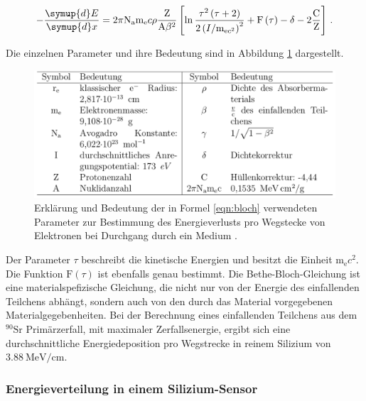 \begin{equation}
    - \frac{\symup{d}E}{\symup{d}x} = 2 \pi \text{N}_\text{a} \text{m}_\text{e} c \rho \frac{\text{Z}}{\text{A} \beta^2}
    \left[\ln{\frac{\tau^2 \left(\tau + 2 \right)}{2 \left(I / \text{m}_{\text{e} c^2} \right)^2}}   
    + \text{F}\left(\tau \right) - \delta - 2 \frac{\text{C}}{\text{Z}} \right] \, .
\label{eqn:bloch}
\end{equation}

Die einzelnen Parameter und ihre Bedeutung sind in Abbildung \ref{fig:TabelleBloch} dargestellt.

\begin{figure}
  \centering
  \includegraphics[width=\textwidth]{content/graphics/Bloch.png}
  \caption{Erklärung und Bedeutung der in Formel \eqref{eqn:bloch} verwendeten 
  Parameter zur Bestimmung des Energieverlusts pro Wegstecke von Elektronen 
  bei Durchgang durch ein Medium \cite{Anleitung}.}
  \label{fig:TabelleBloch}
\end{figure}

Der Parameter $\tau$ beschreibt die kinetische Energien und besitzt die Einheit $\text{m}_\text{e} c^2$. 
Die Funktion $ \text{F}\left(\tau \right)$ ist ebenfalls genau bestimmt. 
Die Bethe-Bloch-Gleichung ist eine materialspefizische Gleichung, die nicht nur 
von der Energie des einfallenden Teilchens abhängt, sondern auch von den durch das
Material vorgegebenen Materialgegebenheiten. Bei der Berechnung eines 
einfallenden Teilchens aus dem $^{90}\text{Sr}$ Primärzerfall, mit maximaler 
Zerfallsenergie, ergibt sich eine durchschnittliche Energiedeposition pro 
Wegstrecke in reinem Silizium von $\SI{3.88}{\mega\electronvolt\per\centi\meter}$.

\subsubsection{Energieverteilung in einem Silizium-Sensor}

